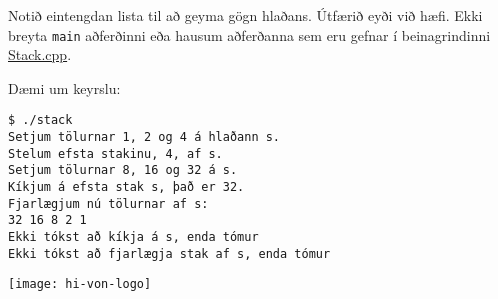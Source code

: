\documentclass{article}
\begin{document}
Notið eintengdan lista til að geyma gögn hlaðans. Útfærið eyði við hæfi. Ekki breyta \texttt{main} aðferðinni eða hausum aðferðanna sem eru gefnar í beinagrindinni \href{https://raw.githubusercontent.com/Ernir/kennsluefni/master/T2/Code/w5/Stack.cpp}{Stack.cpp}.

Dæmi um keyrslu:

\begin{verbatim}
$ ./stack
Setjum tölurnar 1, 2 og 4 á hlaðann s.
Stelum efsta stakinu, 4, af s.
Setjum tölurnar 8, 16 og 32 á s.
Kíkjum á efsta stak s, það er 32.
Fjarlægjum nú tölurnar af s:
32 16 8 2 1
Ekki tókst að kíkja á s, enda tómur
Ekki tókst að fjarlægja stak af s, enda tómur
\end{verbatim}

\vfill
\texttt{[image: hi-von-logo]}
\end{document}
